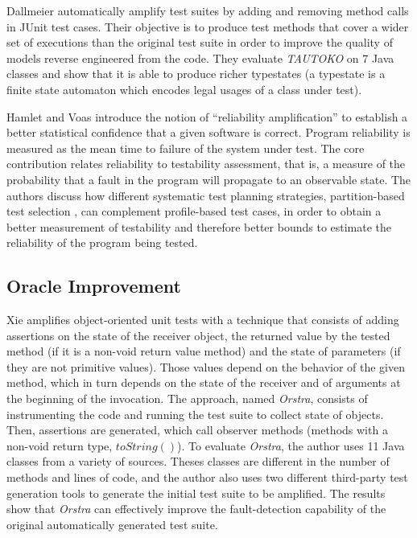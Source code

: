 Dallmeier \etal\cite{Dallmeier2010} automatically amplify test suites by adding and removing method calls in JUnit test cases. 
Their objective is to produce test methods that cover a wider set of executions than the original test suite in order to improve the quality of models reverse engineered from the code. 
They evaluate \emph{TAUTOKO} on 7 Java classes and show that it is able to produce richer typestates (a typestate is a finite state automaton which encodes legal usages of a class under test).

Hamlet and Voas \cite{HamletV93} introduce the notion of ``reliability amplification'' to establish a better statistical confidence that a given software is correct. 
Program reliability is measured as the mean time to failure of the system under test.
The core contribution relates reliability to testability assessment, that is, a measure of the probability that a fault in the program will propagate to an observable state. 
The authors discuss how different systematic test planning strategies, \eg partition-based test selection \cite{ostrand1988category}, can complement profile-based test cases, in order to obtain a better measurement of testability and therefore better bounds to estimate the reliability of the program being tested.

\subsection{Oracle Improvement}
\label{subsec:sota:category-4:oracle-improvement}

Xie \cite{Xie2006} amplifies object-oriented unit tests with a technique that consists of adding assertions on the state of the receiver object, the returned value by the tested method (if it is a non-void return value method) and the state of parameters (if they are not primitive values). 
Those values depend on the behavior of the given method, which in turn depends on the state of the receiver and of arguments at the beginning of the invocation. 
The approach, named \emph{Orstra}, consists of instrumenting the code and running the test suite to collect state of objects. 
Then, assertions are generated, which call observer methods (methods with a non-void return type, \eg $toString()$). 
To evaluate \emph{Orstra}, the author uses 11 Java classes from a variety of sources. 
Theses classes are different in the number of methods and lines of code, and the author also uses two different third-party test generation tools to generate the initial test suite to be amplified. 
The results show that \emph{Orstra} can effectively improve the fault-detection capability of the original automatically generated test suite.

